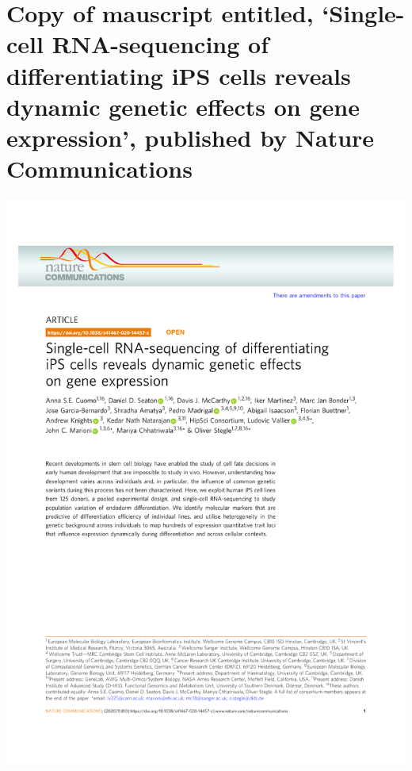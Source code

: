 
\chapter{Copy of mauscript entitled, `Single-cell RNA-sequencing of differentiating iPS cells reveals dynamic genetic effects on gene expression', published by Nature Communications}

\includegraphics{Appendix2/Cuomo_etal_2020.pdf}
